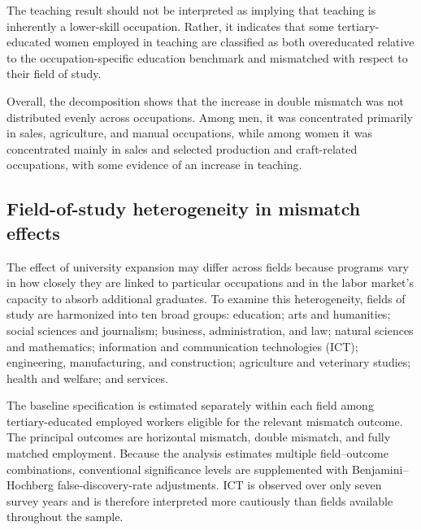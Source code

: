 The teaching result should not be interpreted as implying that teaching is inherently a lower-skill occupation. Rather, it indicates that some tertiary-educated women employed in teaching are classified as both overeducated relative to the occupation-specific education benchmark and mismatched with respect to their field of study.

Overall, the decomposition shows that the increase in double mismatch was not distributed evenly across occupations. Among men, it was concentrated primarily in sales, agriculture, and manual occupations, while among women it was concentrated mainly in sales and selected production and craft-related occupations, with some evidence of an increase in teaching.

\subsection{Field-of-study heterogeneity in mismatch effects}

The effect of university expansion may differ across fields because programs vary in how closely they are linked to particular occupations and in the labor market's capacity to absorb additional graduates. To examine this heterogeneity, fields of study are harmonized into ten broad groups: education; arts and humanities; social sciences and journalism; business, administration, and law; natural sciences and mathematics; information and communication technologies (ICT); engineering, manufacturing, and construction; agriculture and veterinary studies; health and welfare; and services.

The baseline specification is estimated separately within each field among tertiary-educated employed workers eligible for the relevant mismatch outcome. The principal outcomes are horizontal mismatch, double mismatch, and fully matched employment. Because the analysis estimates multiple field--outcome combinations, conventional significance levels are supplemented with Benjamini--Hochberg false-discovery-rate adjustments. ICT is observed over only seven survey years and is therefore interpreted more cautiously than fields available throughout the sample.

